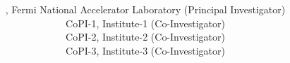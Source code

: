 

\title{\color{NALblue} \bf{\large{\Title}\vspace{-1.\baselineskip}}}
\author{
\Name, Fermi National Accelerator Laboratory (Principal Investigator) \\ 
CoPI-1, Institute-1 (Co-Investigator)\\
CoPI-2, Institute-2 (Co-Investigator)\\
CoPI-3, Institute-3 (Co-Investigator)
}
\date{}
